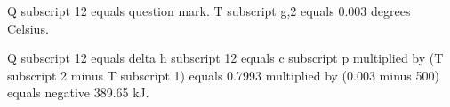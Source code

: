 Q subscript 12 equals question mark.  
T subscript g,2 equals 0.003 degrees Celsius.  

Q subscript 12 equals delta h subscript 12 equals c subscript p multiplied by (T subscript 2 minus T subscript 1) equals 0.7993 multiplied by (0.003 minus 500) equals negative 389.65 kJ.